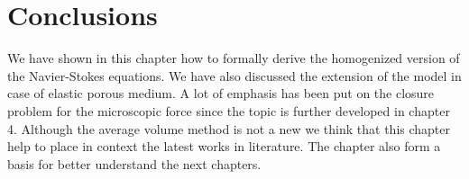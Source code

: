 \section{Conclusions}
We have shown in this chapter how to formally derive the homogenized version of the Navier-Stokes equations. We have also discussed the extension of the model in case of elastic porous medium. A lot of emphasis has been put on the closure problem for the microscopic force since the topic is further developed in chapter 4.
Although the average volume method is not a new we think that this chapter help to place in context the latest works in literature. The chapter also form a basis for better understand the next chapters.

